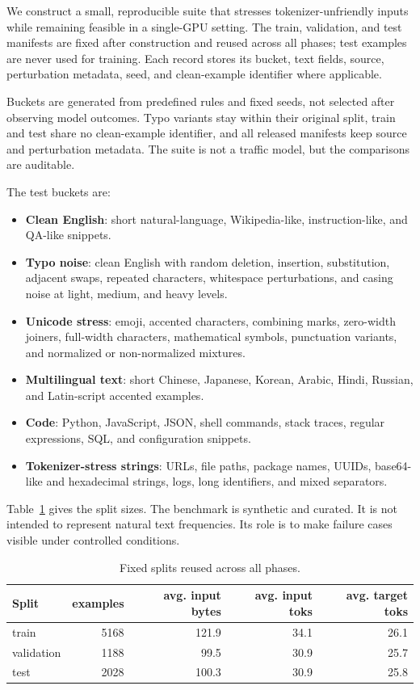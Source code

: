 \documentclass[runningheads]{llncs}
\begin{document}
We construct a small, reproducible suite that stresses tokenizer-unfriendly inputs while remaining feasible in a single-GPU setting. The train, validation, and test manifests are fixed after construction and reused across all phases; test examples are never used for training. Each record stores its bucket, text fields, source, perturbation metadata, seed, and clean-example identifier where applicable.

Buckets are generated from predefined rules and fixed seeds, not selected after observing model outcomes. Typo variants stay within their original split, train and test share no clean-example identifier, and all released manifests keep source and perturbation metadata. The suite is not a traffic model, but the comparisons are auditable.

The test buckets are:
\begin{itemize}
    \item \textbf{Clean English}: short natural-language, Wikipedia-like, instruction-like, and QA-like snippets.
    \item \textbf{Typo noise}: clean English with random deletion, insertion, substitution, adjacent swaps, repeated characters, whitespace perturbations, and casing noise at light, medium, and heavy levels.
    \item \textbf{Unicode stress}: emoji, accented characters, combining marks, zero-width joiners, full-width characters, mathematical symbols, punctuation variants, and normalized or non-normalized mixtures.
    \item \textbf{Multilingual text}: short Chinese, Japanese, Korean, Arabic, Hindi, Russian, and Latin-script accented examples.
    \item \textbf{Code}: Python, JavaScript, JSON, shell commands, stack traces, regular expressions, SQL, and configuration snippets.
    \item \textbf{Tokenizer-stress strings}: URLs, file paths, package names, UUIDs, base64-like and hexadecimal strings, logs, long identifiers, and mixed separators.
\end{itemize}

Table~\ref{tab:data} gives the split sizes. The benchmark is synthetic and curated. It is not intended to represent natural text frequencies. Its role is to make failure cases visible under controlled conditions.

\begin{table}[t]
\centering
\caption{Fixed splits reused across all phases.}
\label{tab:data}
\small
\begin{tabular}{lrrrr}
\toprule
Split & examples & avg. input bytes & avg. input toks & avg. target toks \\
\midrule
train & 5168 & 121.9 & 34.1 & 26.1 \\
validation & 1188 & 99.5 & 30.9 & 25.7 \\
test & 2028 & 100.3 & 30.9 & 25.8 \\
\bottomrule
\end{tabular}
\end{table}
\end{document}
